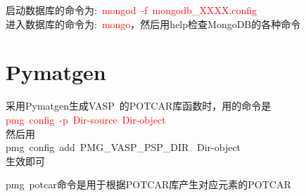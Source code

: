 \documentclass[10pt,a4paper]{article}
\begin{document}
启动数据库的命令为:~\textrm{\textcolor{red}{mongod~-f~mongodb\_XXXX.config}}\\

进入数据库的命令为:~\textrm{\textcolor{red}{mongo}}，然后用\textrm{help}检查\textrm{MongoDB}的各种命令

\section{\rm{Pymatgen}}
采用\textrm{Pymatgen}生成\textrm{VASP}~的\textrm{POTCAR}库函数时，用的命令是\\
\textcolor{red}{\textrm{pmg~config~-p~Dir-source~Dir-object}}\\
然后用\\
\textrm{pmg~config~add~PMG\_VASP\_PSP\_DIR ~Dir-object} \\
生效即可

\textrm{pmg~potcar}命令是用于根据\textrm{POTCAR}库产生对应元素的\textrm{POTCAR}




\end{document}
